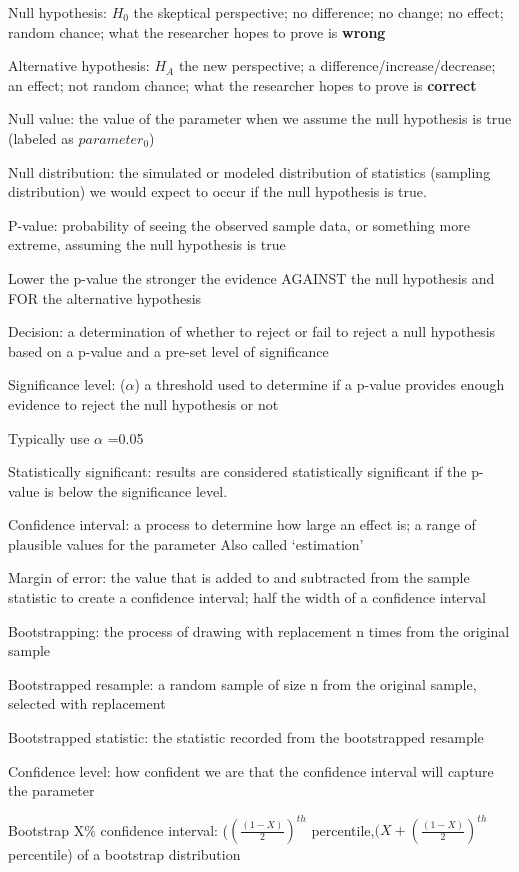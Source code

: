 \documentclass[
]{report}
\newcommand{\rgi}{\hspace{24pt}}  %
\begin{document}
Null hypothesis: \(H_0\) the skeptical perspective; no difference; no change; no effect; random chance; what the researcher hopes to prove is \textbf{wrong}

Alternative hypothesis: \(H_A\) the new perspective; a difference/increase/decrease; an effect; not random chance; what the researcher hopes to prove is \textbf{correct}

Null value: the value of the parameter when we assume the null hypothesis is true (labeled as \(parameter_0\))

Null distribution: the simulated or modeled distribution of statistics (sampling distribution) we would expect to occur if the null hypothesis is true.

P-value: probability of seeing the observed sample data, or something more extreme, assuming the null hypothesis is true

\rgi Lower the p-value the stronger the evidence AGAINST the null hypothesis and FOR the alternative hypothesis

Decision: a determination of whether to reject or fail to reject a null hypothesis based on a p-value and a pre-set level of significance

Significance level: (\(\alpha\)) a threshold used to determine if a p-value provides enough evidence to reject the null hypothesis or not

\rgi Typically use \(\alpha\) =0.05

Statistically significant: results are considered statistically significant if the p-value is below the significance level.

Confidence interval: a process to determine how large an effect is; a range of plausible values for the parameter
\rgi Also called `estimation'

Margin of error: the value that is added to and subtracted from the sample statistic to create a confidence interval; half the width of a confidence interval

Bootstrapping: the process of drawing with replacement n times from the original sample

Bootstrapped resample: a random sample of size n from the original sample, selected with replacement

Bootstrapped statistic: the statistic recorded from the bootstrapped resample

Confidence level: how confident we are that the confidence interval will capture the parameter

Bootstrap X\% confidence interval: (\((\frac{(1-X)}{2})^{th}\) percentile,\((X+(\frac{(1-X)}{2})^{th}\) percentile) of a bootstrap distribution
\end{document}
